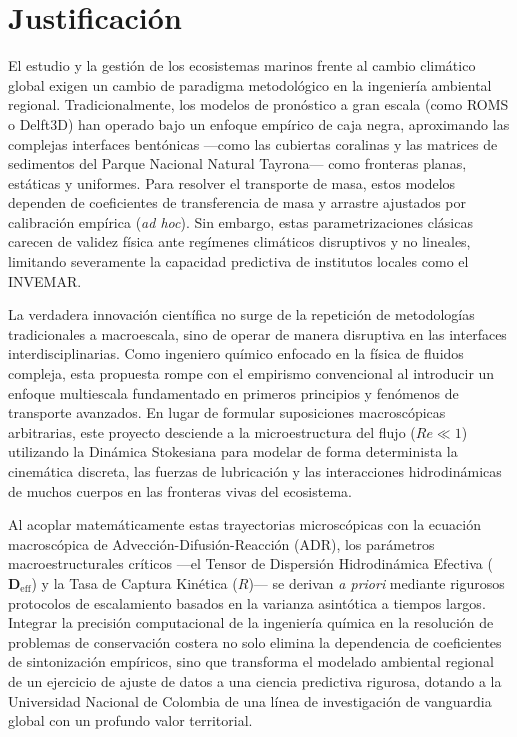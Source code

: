 \section{Justificación}
\label{sec:justification}

El estudio y la gestión de los ecosistemas marinos frente al cambio climático global exigen un cambio de paradigma metodológico en la ingeniería ambiental regional. Tradicionalmente, los modelos de pronóstico a gran escala (como ROMS o Delft3D) han operado bajo un enfoque empírico de caja negra, aproximando las complejas interfaces bentónicas ---como las cubiertas coralinas y las matrices de sedimentos del Parque Nacional Natural Tayrona--- como fronteras planas, estáticas y uniformes. Para resolver el transporte de masa, estos modelos dependen de coeficientes de transferencia de masa y arrastre ajustados por calibración empírica (\emph{ad hoc}). Sin embargo, estas parametrizaciones clásicas carecen de validez física ante regímenes climáticos disruptivos y no lineales, limitando severamente la capacidad predictiva de institutos locales como el INVEMAR.

La verdadera innovación científica no surge de la repetición de metodologías tradicionales a macroescala, sino de operar de manera disruptiva en las interfaces interdisciplinarias. Como ingeniero químico enfocado en la física de fluidos compleja, esta propuesta rompe con el empirismo convencional al introducir un enfoque multiescala fundamentado en primeros principios y fenómenos de transporte avanzados. En lugar de formular suposiciones macroscópicas arbitrarias, este proyecto desciende a la microestructura del flujo ($Re \ll 1$) utilizando la Dinámica Stokesiana para modelar de forma determinista la cinemática discreta, las fuerzas de lubricación y las interacciones hidrodinámicas de muchos cuerpos en las fronteras vivas del ecosistema.

Al acoplar matemáticamente estas trayectorias microscópicas con la ecuación macroscópica de Advección-Difusión-Reacción (ADR), los parámetros macroestructurales críticos ---el Tensor de Dispersión Hidrodinámica Efectiva ($\bm{D}_{\text{eff}}$) y la Tasa de Captura Kinética ($R$)--- se derivan \emph{a priori} mediante rigurosos protocolos de escalamiento basados en la varianza asintótica a tiempos largos. Integrar la precisión computacional de la ingeniería química en la resolución de problemas de conservación costera no solo elimina la dependencia de coeficientes de sintonización empíricos, sino que transforma el modelado ambiental regional de un ejercicio de ajuste de datos a una ciencia predictiva rigurosa, dotando a la Universidad Nacional de Colombia de una línea de investigación de vanguardia global con un profundo valor territorial.
